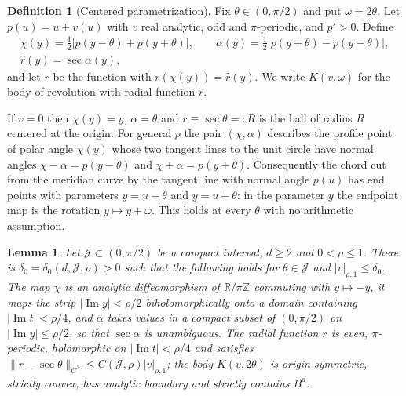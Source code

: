 \documentclass[11pt]{amsart}
\numberwithin{equation}{section}
\newtheorem{lemma}[theorem]{Lemma}
\theoremstyle{definition}
\newtheorem{definition}[theorem]{Definition}
\theoremstyle{remark}
\newcommand{\R}{\mathbb{R}}
\newcommand{\Z}{\mathbb{Z}}
\newcommand{\abs}[1]{\lvert #1\rvert}
\newcommand{\norm}[1]{\lVert #1\rVert}
\begin{document}
\begin{definition}[Centered parametrization]\label{def:centered}
Fix $\theta\in(0,\pi/2)$ and put $\omega=2\theta$. Let $p(u)=u+v(u)$ with $v$ real analytic, odd and $\pi$-periodic, and $p'>0$. Define
\begin{gather*}
\chi(y)=\tfrac12\bigl[p(y-\theta)+p(y+\theta)\bigr],\qquad \alpha(y)=\tfrac12\bigl[p(y+\theta)-p(y-\theta)\bigr],\\
\hat r(y)=\sec\alpha(y),
\end{gather*}
and let $r$ be the function with $r(\chi(y))=\hat r(y)$. We write $K(v,\omega)$ for the body of revolution with radial function $r$.
\end{definition}

If $v=0$ then $\chi(y)=y$, $\alpha=\theta$ and $r\equiv\sec\theta=:R$ is the ball of radius $R$ centered at the origin. For general $p$ the pair $(\chi,\alpha)$ describes the profile point of polar angle $\chi(y)$ whose two tangent lines to the unit circle have normal angles $\chi-\alpha=p(y-\theta)$ and $\chi+\alpha=p(y+\theta)$. Consequently the chord cut from the meridian curve by the tangent line with normal angle $p(u)$ has end points with parameters $y=u-\theta$ and $y=u+\theta$: in the parameter $y$ the endpoint map is the rotation $y\mapsto y+\omega$. This holds at every $\theta$ with no arithmetic assumption.

\begin{lemma}\label{lem:centered}
Let $\mathcal J\subset(0,\pi/2)$ be a compact interval, $d\ge2$ and $0<\rho\le1$. There is $\delta_0=\delta_0(d,\mathcal J,\rho)>0$ such that the following holds for $\theta\in\mathcal J$ and $\abs v_{\rho,1}\le\delta_0$. The map $\chi$ is an analytic diffeomorphism of $\R/\pi\Z$ commuting with $y\mapsto-y$, it maps the strip $\abs{\operatorname{Im}y}<\rho/2$ biholomorphically onto a domain containing $\abs{\operatorname{Im}t}<\rho/4$, and $\alpha$ takes values in a compact subset of $(0,\pi/2)$ on $\abs{\operatorname{Im}y}\le\rho/2$, so that $\sec\alpha$ is unambiguous. The radial function $r$ is even, $\pi$-periodic, holomorphic on $\abs{\operatorname{Im}t}<\rho/4$ and satisfies $\norm{r-\sec\theta}_{C^2}\le C(\mathcal J,\rho)\abs v_{\rho,1}$; the body $K(v,2\theta)$ is origin symmetric, strictly convex, has analytic boundary and strictly contains $B^d$.
\end{lemma}
\end{document}
